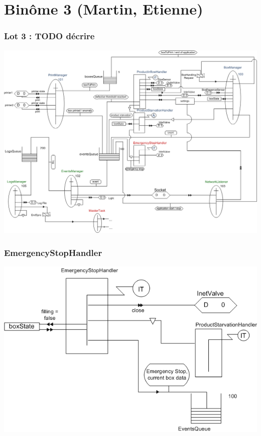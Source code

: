 \documentclass{beamer}
\begin{document}
\section{Binôme 3 (Martin, Etienne)}
	\begin{frame}
	    \begin{center}
		    \frametitle{Lot 3 : TODO décrire}
		    \includegraphics[height=0.8\textheight]{../../SchemasLCG/schemaGlobal.png}
	    \end{center}
	\end{frame}

	\begin{frame}
	    \begin{center}
		    \frametitle{EmergencyStopHandler}
		    \includegraphics[height=0.8\textheight]{../../SchemasLCG/EmergencyStopHandler.png}
	    \end{center}
	\end{frame}
\end{document}
